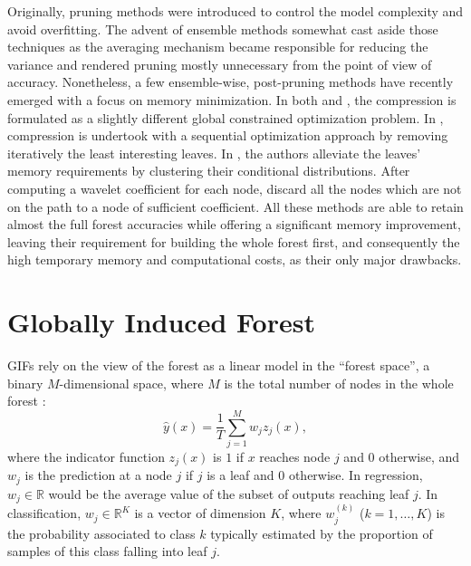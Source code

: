 \documentclass{article}
\begin{document}
Originally, pruning methods were introduced to control the model complexity and
avoid overfitting. The advent of ensemble methods somewhat cast aside those
techniques as the averaging mechanism became responsible for reducing the
variance and rendered pruning mostly unnecessary from the point of view of
accuracy. Nonetheless, a few ensemble-wise, post-pruning methods have recently
emerged with a focus on memory minimization. In both
\cite{meinshausen2009forestgarrote} and \cite{l1basedcomp}, the compression is
formulated as a slightly different global constrained optimization problem.  In
\cite{ren2015glorefinement}, compression is undertook with a sequential
optimization approach by removing iteratively the least interesting leaves.  In
\cite{vleeschouwer2015mitimemreq}, the authors alleviate the leaves' memory
requirements by clustering their conditional distributions. After computing a
wavelet coefficient for each node, \citet{elisha2016wavelet} discard all the
nodes which are not on the path to a node of sufficient coefficient.  All these
methods are able to retain almost the full forest accuracies while offering a
significant memory improvement, leaving their requirement for building the whole
forest first, and consequently the high temporary memory and computational
costs, as their only major drawbacks.

\section{Globally Induced Forest}
\label{sec:gif}

GIFs rely on the view of the forest as a linear model in the ``forest space'', 
a binary $M$-dimensional space, where $M$ is the total number of nodes in the 
whole forest \cite{l1basedcomp,vens2011random}:
%
\begin{equation}\label{eq:fs}
\hat{y}(x) =  \frac{1}{T} \sum_{j=1}^{M} w_j z_j(x),
\end{equation}
where the indicator function $z_j(x)$ is $1$ if $x$ reaches node $j$ and $0$
otherwise, and $w_j$ is the prediction at a node $j$ if $j$ is a leaf and $0$
otherwise. In regression, $w_j \in \mathbb{R}$ would be the average value of
the subset of outputs reaching leaf $j$. In classification, $w_j \in
\mathbb{R}^K$ is a vector of dimension $K$, where $w_j^{(k)}$ ($k=1,\ldots,K$)
is the probability associated to class $k$ typically estimated by the
proportion of samples of this class falling into leaf $j$.
\end{document}

